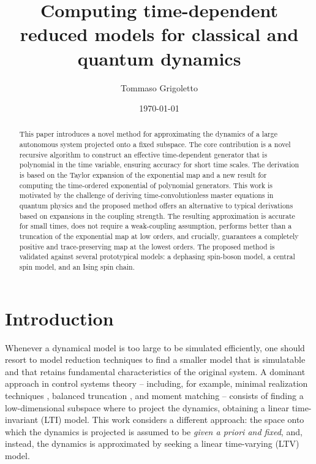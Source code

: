 \documentclass[10pt,aps,pra,twocolumn,showpacs,superscriptaddress,nobalancelastpage,notitlepage,nofootinbib,longbibliography]{revtex4-2}
\begin{document}
\title{Computing time-dependent reduced models for classical and quantum dynamics}

\author{Tommaso Grigoletto}


\date{\today}

\begin{abstract}
    This paper introduces a novel method for approximating the dynamics of a large autonomous system projected onto a fixed subspace. The core contribution is a novel recursive algorithm to construct an effective time-dependent generator that is polynomial in the time variable, ensuring accuracy for short time scales. The derivation is based on the Taylor expansion of the exponential map and a new result for computing the time-ordered exponential of polynomial generators.
    This work is motivated by the challenge of deriving time-convolutionless master equations in quantum physics and the proposed method offers an alternative to typical derivations based on expansions in the coupling strength. 
    The resulting approximation is accurate for small times, does not require a weak-coupling assumption, performs better than a truncation of the exponential map at low orders, and crucially, guarantees a completely positive and trace-preserving map at the lowest orders. The proposed method is validated against several prototypical models: a dephasing spin-boson model, a central spin model, and an Ising spin chain.
\end{abstract}

\maketitle

\section{Introduction}
Whenever a dynamical model is too large to be simulated efficiently, one should resort to model reduction techniques to find a smaller model that is simulatable and that retains fundamental characteristics of the original system. A dominant approach in control systems theory -- including, for example, minimal realization techniques \cite{rosenbrock1970state}, balanced truncation \cite{antoulas,gugercin2004survey}, and moment matching \cite{astolfi_moment_matching,padoanmomentmatching} -- consists of finding a low-dimensional subspace where to project the dynamics, obtaining a linear time-invariant (LTI) model. This work considers a different approach: the space onto which the dynamics is projected is assumed to be {\em given a priori and fixed}, and, instead, the dynamics is approximated by seeking a linear time-varying (LTV) model. 
\end{document}
